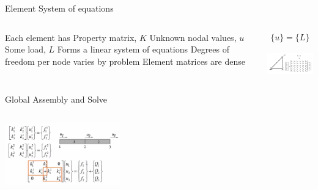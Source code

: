 \begin{frame}{Element System of equations}
\begin{columns}
\begin{outline}
\1 Each element has
\2 Property matrix, $K$
\2 Unknown nodal values, $u$
\2 Some load, $L$
\1 Forms a linear system of equations
\1 Degrees of freedom per node varies by problem
\1 Element matrices are dense
\end{outline}

\begin{center}
  \begin{align*}
    [K]\{u\} = \{L\}
  \end{align*}

  \vspace{1cm}

  \includegraphics[width=5.5cm]{displacement_system.png}
\end{center}
\end{columns}
\end{frame}

\begin{frame}{Global Assembly and Solve}
  \begin{columns}
  \begin{center}
    \includegraphics[width=5cm]{two_element_example.png}
  \end{center}

  \begin{center}
  \end{center}
  \end{columns}
\end{frame}


